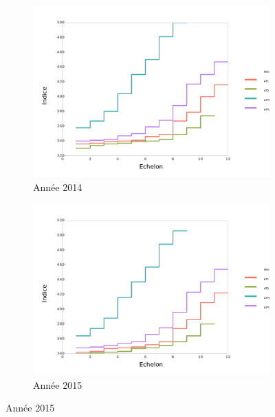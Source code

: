 \documentclass[11pt,a4paper]{article}
\begin{document}
\begin{figure}[ht]
  \begin{subfigure}[b]{0.55\linewidth}
      \caption{Année 2014} 
    \label{echelon_by_neg_2} 
    \centering
    \includegraphics[width=1\linewidth]{2_grille_by_date.pdf} 
  \end{subfigure}%
  \begin{subfigure}[b]{0.55\linewidth}
      \caption{Année 2015} 
    \label{echelon_by_neg_3} 
    \centering
    \includegraphics[width=1\linewidth]{3_grille_by_date.pdf} 
  \end{subfigure} 
\end{figure}




\clearpage
\end{document}
